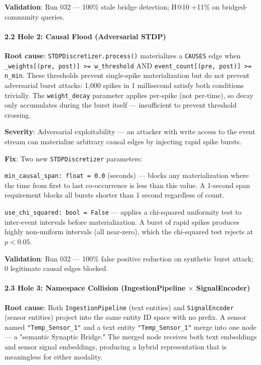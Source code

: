 \textbf{Validation}: Run 032 — 100\% stale bridge detection; H@10 +11\% on bridged-community queries.

\paragraph{2.2 Hole 2: Causal Flood (Adversarial STDP)}

\textbf{Root cause}: \texttt{STDPDiscretizer.process()} mater\-ializes a \texttt{CAUSES} edge when \texttt{\_weights[(pre, post)] \textgreater = w\_threshold} AND \texttt{event\_count[(pre, post)] \textgreater = n\_min}. These thresholds prevent single-spike mater\-ialization but do not prevent adversarial burst attacks: 1,000 spikes in 1 millisecond satisfy both conditions trivially. The \texttt{weight\_decay} parameter applies per-spike (not per-time), so decay only accumulates during the burst itself — insuf\-ficient to prevent threshold crossing.

\textbf{Severity}: Adversarial explo\-itability — an attacker with write access to the event stream can materialize arbitrary causal edges by injecting rapid spike bursts.

\textbf{Fix}: Two new \texttt{STDPDiscretizer} parameters:

\texttt{min\_causal\_span: float = 0.0} (seconds) — blocks any mater\-ialization where the time from first to last co-occurrence is less than this value. A 1-second span requirement blocks all bursts shorter than 1 second regardless of count.

\texttt{use\_chi\_squared: bool = False} — applies a chi-squared uniformity test to inter-event intervals before mater\-ialization. A burst of rapid spikes produces highly non-uniform intervals (all near-zero), which the chi-squared test rejects at $p < 0.05$.

\textbf{Validation}: Run 032 — 100\% false positive reduction on synthetic burst attack; 0 legitimate causal edges blocked.

\paragraph{2.3 Hole 3: Namespace Collision (IngestionPipeline $\times$ SignalEncoder)}

\textbf{Root cause}: Both \texttt{IngestionPipeline} (text entities) and \texttt{SignalEncoder} (sensor entities) project into the same entity ID space with no prefix. A sensor named \texttt{"Temp\_Sensor\_1"} and a text entity \texttt{"Temp\_Sensor\_1"} merge into one node — a "semantic Synaptic Bridge." The merged node receives both text embeddings and sensor signal embeddings, producing a hybrid repre\-sentation that is meaningless for either modality.

